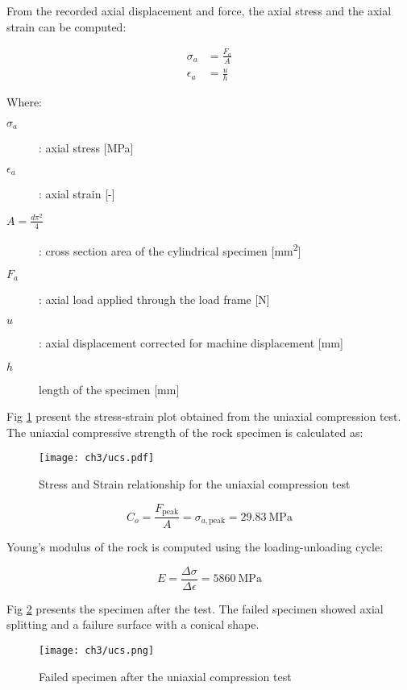 From the recorded axial displacement and force, the axial stress and the axial strain can be computed: 

\begin{align}
    \sigma_a &= \frac{F_a}{A} \\
    \epsilon_a &= \frac{u}{h}
\end{align}

Where:

\begin{description}
    \item[$\sigma_a$] : axial stress  [\si{\mega\pascal}]
    \item[$\epsilon_a$] : axial strain [-]
    \item[$A=\frac{d\pi^2}{4}$] : cross section area of the cylindrical specimen [\si{\milli\meter\squared}]
    \item[$F_a$] :  axial load applied through the load frame [\si{\newton}]
    \item[$u$] : axial displacement corrected for machine displacement [\si{\milli\meter}]
    \item[$h$]  length of the specimen [\si{\milli\meter}]
\end{description}

Fig \ref{fig3:2} present the stress-strain plot obtained from the uniaxial compression test. The uniaxial compressive strength of the rock specimen is calculated as: 


\begin{figure}[p]
    \centering
    \texttt{[image: ch3/ucs.pdf]}
    \caption{Stress and Strain relationship for the uniaxial compression test}
    \label{fig3:2}
\end{figure} 

\begin{equation}
    C_o = \frac{F_\text{peak}}{A} = \sigma_{a,\text{peak}} = \SI{29.83}{\mega\pascal}
\end{equation}

Young’s modulus of the rock is computed using the loading-unloading cycle:

\begin{equation}
    E=\frac{\Delta\sigma}{\Delta\epsilon} = \SI{5860}{\mega\pascal}
\end{equation}

Fig \ref{fig3:3} presents the specimen after the test. The failed specimen showed axial splitting and a failure surface with a conical shape. 

\begin{figure}[p]
    \centering
    \texttt{[image: ch3/ucs.png]}
    \caption{Failed specimen after the uniaxial compression test}
    \label{fig3:3}
\end{figure} 

